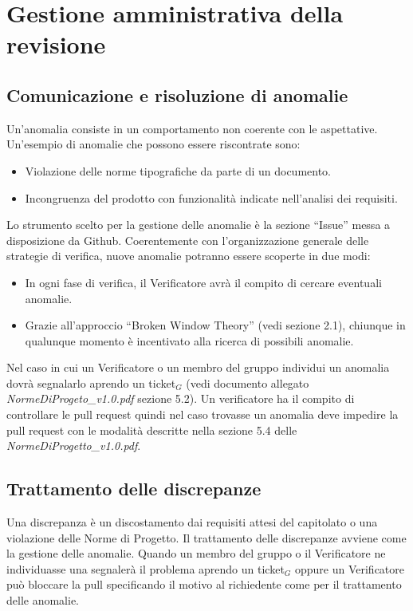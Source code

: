 \section{Gestione amministrativa della revisione}
\subsection{Comunicazione e risoluzione di anomalie}
Un'anomalia consiste in un comportamento non coerente con le aspettative. Un'esempio di anomalie che possono essere riscontrate sono:
\begin{itemize}
	\item Violazione delle norme tipografiche da parte di un documento.
	\item Incongruenza del prodotto con funzionalità indicate nell'analisi dei requisiti.
\end{itemize}
Lo strumento scelto per la gestione delle anomalie è la sezione “Issue” messa a disposizione da Github. Coerentemente con l'organizzazione generale delle strategie di verifica, nuove anomalie potranno essere scoperte in due modi:

\begin{itemize}
	\item In ogni fase di verifica, il Verificatore avrà il compito di cercare eventuali anomalie.
	\item Grazie all'approccio “Broken Window Theory” (vedi sezione 2.1), chiunque in qualunque momento è incentivato alla ricerca di possibili anomalie.
\end{itemize}
Nel caso in cui un Verificatore o un membro del gruppo individui un anomalia dovrà segnalarlo aprendo un ticket$_G$ (vedi documento allegato \textit{NormeDiProgeto\_v1.0.pdf} sezione 5.2). Un verificatore ha il compito di controllare le pull request quindi nel caso trovasse un anomalia deve impedire la pull request con le modalità descritte nella sezione 5.4 delle \textit{NormeDiProgetto\_v1.0.pdf}.

\subsection{Trattamento delle discrepanze}
Una discrepanza è un discostamento dai requisiti attesi del capitolato o una violazione delle Norme di Progetto. Il trattamento delle discrepanze avviene come la gestione delle anomalie. Quando un membro del gruppo o il Verificatore ne individuasse una segnalerà il problema aprendo un ticket$_G$ oppure un Verificatore può bloccare la pull specificando il motivo al richiedente come per il trattamento delle anomalie.

